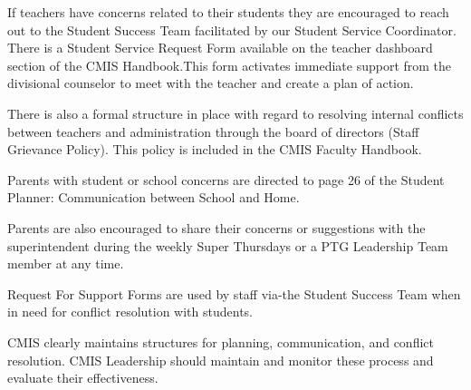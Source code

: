 \begin{findings}
If teachers have concerns related to their students they are encouraged to reach out to the Student Success Team facilitated by our Student Service Coordinator. There is a Student Service Request Form available on the teacher dashboard section of the CMIS Handbook.This form activates immediate support from the divisional counselor to meet with the teacher and create a plan of action.

There is also a formal structure in place with regard to resolving internal conflicts between teachers and administration  through the board of directors (Staff Grievance Policy). This policy is included in the CMIS Faculty Handbook.

Parents with student or school concerns are directed to page 26 of the Student Planner: Communication between School and Home. 

Parents are also encouraged to share their concerns or suggestions with the superintendent during the weekly Super Thursdays or a PTG Leadership Team member at any time. 

Request For Support Forms are used by staff via-the Student Success Team when in need for conflict resolution with students.

CMIS clearly maintains structures for planning, communication, and conflict resolution. CMIS Leadership should maintain and monitor these process and evaluate their effectiveness. 

\end{findings}
